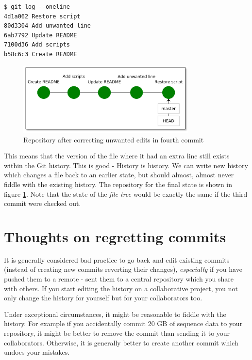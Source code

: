 \documentclass[../main/git_course_main.tex]{subfiles}
\begin{document}
\begin{codebox}
\begin{lstlisting}
$ git log --oneline
4d1a062 Restore script
80d3304 Add unwanted line
6ab7792 Update README
7100d36 Add scripts
b58c6c3 Create README
\end{lstlisting}
\end{codebox}

\begin{figure}[h!]
	\centering
	\includegraphics[width=0.8\textwidth]{../visualizations/chapter3/c32_fixed_unwanted_changes.pdf}
	\caption{Repository after correcting unwanted edits in fourth commit}
	\label{fig:correcting_unwanted_changes}
\end{figure}

This means that the version of the file where it had an extra line still exists within the Git history. This is good - History is history. We can write new history which changes a file back to an earlier state, but should almost, almost never fiddle with the existing history. The repository for the final state is shown in figure \ref{fig:correcting_unwanted_changes}. Note that the state of the \textit{file tree} would be exactly the same if the third commit were checked out.

\section{Thoughts on regretting commits}

It is generally considered bad practice to go back and edit existing commits (instead of creating new commits reverting their changes), \textit{especially} if you have pushed them to a remote - sent them to a central repository which you share with others.
If you start editing the history on a collaborative project, you not only change the history for yourself but for your collaborators too.

Under exceptional circumstances, it might be reasonable to fiddle with the history. For example if you accidentally commit 20 GB of sequence data
to your repository, it might be better to remove the commit than sending it to your collaborators. Otherwise, it is generally better
to create another commit which undoes your mistakes.
\end{document}
